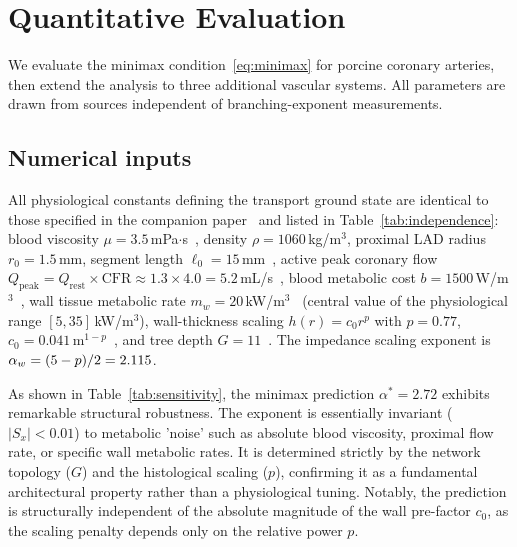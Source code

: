 \documentclass[11pt,a4paper]{article}
\theoremstyle{remark}
\begin{document}
\section{Quantitative Evaluation}
\label{sec:results}

We evaluate the minimax condition~\eqref{eq:minimax} for porcine
coronary arteries, then extend the analysis to three additional vascular
systems.  All parameters are drawn from sources independent of
branching-exponent measurements.

\subsection{Numerical inputs}

All physiological constants defining the transport ground state are
identical to those specified in the companion paper~\cite{Marchesi2026static}
and listed in Table~\ref{tab:independence}:
blood viscosity $\mu = 3.5$\,mPa$\cdot$s~\cite{Caro1978},
density $\rho = 1060$\,kg/m$^3$,
proximal LAD radius $r_0 = 1.5$\,mm,
segment length $\ell_0 = 15$\,mm~\cite{Kassab1993},
active peak coronary flow
$Q_{\mathrm{peak}} = Q_{\mathrm{rest}} \times \mathrm{CFR}
\approx 1.3 \times 4.0 = 5.2$\,mL/s~\cite{Taber1998,Kassab1993},
blood metabolic cost $b = 1500$\,W/m$^3$~\cite{Murray1926,Taber1998},
wall tissue metabolic rate
$m_w = 20$\,kW/m$^3$~\cite{Paul1980}
(central value of the physiological range $[5, 35]$\,kW/m$^3$),
wall-thickness scaling
$h(r) = c_0 r^p$ with $p = 0.77$, $c_0 =
0.041$\,m$^{1-p}$~\cite{Rhodin1967,Nichols2011},
and tree depth $G = 11$~\cite{Kassab1993}.
The impedance scaling exponent is
$\alpha_w = (5 - p)/2 = 2.115$.

As shown in Table~\ref{tab:sensitivity}, the minimax prediction $\alpha^* =
2.72$ exhibits remarkable structural robustness. The exponent is essentially
invariant ($|S_x| < 0.01$) to metabolic 'noise' such as absolute blood
viscosity, proximal flow rate, or specific wall metabolic rates. It is
determined strictly by the network topology ($G$) and the histological scaling
($p$), confirming it as a fundamental architectural property rather than a
physiological tuning. Notably, the prediction is structurally independent of the
absolute magnitude of the wall pre-factor $c_0$, as the scaling penalty depends
only on the relative power $p$.
\end{document}
